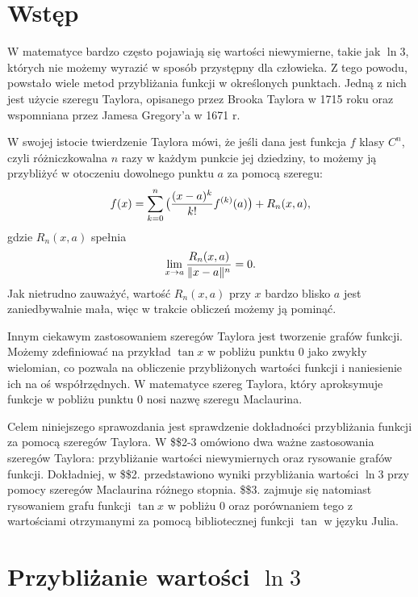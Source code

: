\documentclass[11pt, wide, leqno]{mwart}
\begin{document}
\maketitle
\tableofcontents

\section{Wstęp}

W matematyce bardzo często pojawiają się wartości niewymierne, takie jak $\ln 3$, których nie możemy wyrazić w sposób przystępny dla człowieka. Z tego powodu, powstało wiele metod przybliżania funkcji w określonych punktach. Jedną z nich jest użycie szeregu Taylora, opisanego przez Brooka Taylora w 1715 roku oraz wspomniana przez Jamesa Gregory'a w 1671 r.
\medskip

W swojej istocie twierdzenie Taylora mówi, że jeśli dana jest funkcja $f$ klasy $C^n$, czyli różniczkowalna $n$ razy w każdym punkcie jej dziedziny, to możemy ją przybliżyć w otoczeniu dowolnego punktu $a$ za pomocą szeregu:
$$f(x)=\sum\limits_{k=0}^n\big({(x-a)^k\over k!} f^{(k)}(a)\big)+R_n(x, a),$$
gdzie $R_n(x, a)$ spełnia
$$\lim\limits_{x\to a}{R_n(x,a)\over\|x-a\|^n}=0.$$
Jak nietrudno zauważyć, wartość $R_n(x, a)$ przy $x$ bardzo blisko $a$ jest zaniedbywalnie mała, więc w trakcie obliczeń możemy ją pominąć.

Innym ciekawym zastosowaniem szeregów Taylora jest tworzenie grafów funkcji. Możemy zdefiniować na przykład $\tan x$ w pobliżu punktu $0$ jako zwykły wielomian, co pozwala na obliczenie przybliżonych wartości funkcji i naniesienie ich na oś współrzędnych. W matematyce szereg Taylora, który aproksymuje funkcje w pobliżu punktu $0$ nosi nazwę szeregu Maclaurina.

Celem niniejszego sprawozdania jest sprawdzenie dokładności przybliżania funkcji za pomocą szeregów Taylora. W \$\$2-3 omówiono dwa ważne zastosowania szeregów Taylora: przybliżanie wartości niewymiernych oraz rysowanie grafów funkcji. Dokładniej, w \$\$2. przedstawiono wyniki przybliżania wartości $\ln 3$ przy pomocy szeregów Maclaurina różnego stopnia. \$\$3. zajmuje się natomiast rysowaniem grafu funkcji $\tan x$ w pobliżu $0$ oraz porównaniem tego z wartościami otrzymanymi za pomocą bibliotecznej funkcji $\tan$ w języku Julia.

\section{Przybliżanie wartości $\ln3$}
\end{document}
